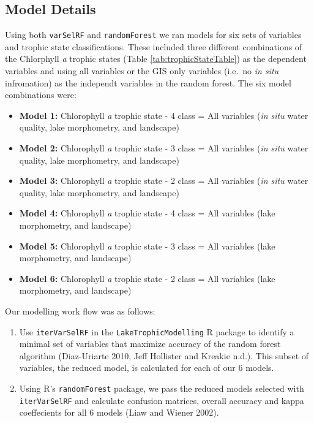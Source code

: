 \documentclass[11pt,]{article}
\begin{document}
\subsection{Model Details}\label{model-details}

Using both \texttt{varSelRF} and \texttt{randomForest} we ran models for
six sets of variables and trophic state classifications. These included
three different combinations of the Chlorphyll \emph{a} trophic states
(Table \ref{tab:trophicStateTable}) as the dependent variables and using
all variables or the GIS only variables (i.e.~no \emph{in situ}
infromation) as the independt variables in the random forest. The six
model combinations were:

\begin{itemize}
\itemsep1pt\parskip0pt
\item
  \textbf{Model 1:} Chlorophyll \emph{a} trophic state - 4 class = All
  variables (\emph{in situ} water quality, lake morphometry, and
  landscape)
\item
  \textbf{Model 2:} Chlorophyll \emph{a} trophic state - 3 class = All
  variables (\emph{in situ} water quality, lake morphometry, and
  landscape)
\item
  \textbf{Model 3:} Chlorophyll \emph{a} trophic state - 2 class = All
  variables (\emph{in situ} water quality, lake morphometry, and
  landscape)
\item
  \textbf{Model 4:} Chlorophyll \emph{a} trophic state - 4 class = All
  variables (lake morphometry, and landscape)
\item
  \textbf{Model 5:} Chlorophyll \emph{a} trophic state - 3 class = All
  variables (lake morphometry, and landscape)
\item
  \textbf{Model 6:} Chlorophyll \emph{a} trophic state - 2 class = All
  variables (lake morphometry, and landscape)
\end{itemize}

Our modelling work flow was as follows:

\begin{enumerate}
\def\labelenumi{\arabic{enumi}.}
\itemsep1pt\parskip0pt
\item
  Use \texttt{iterVarSelRF} in the \texttt{LakeTrophicModelling} R
  package to identify a minimal set of variables that maximize accuracy
  of the random forest algorithm (Diaz-Uriarte 2010, Jeff Hollister and
  Kreakie n.d.). This subset of variables, the reduced model, is
  calculated for each of our 6 models.
\item
  Using R's \texttt{randomForest} package, we pass the reduced models
  selected with \texttt{iterVarSelRF} and calculate confusion matrices,
  overall accuracy and kappa coeffecients for all 6 models (Liaw and
  Wiener 2002).
\end{enumerate}
\end{document}
